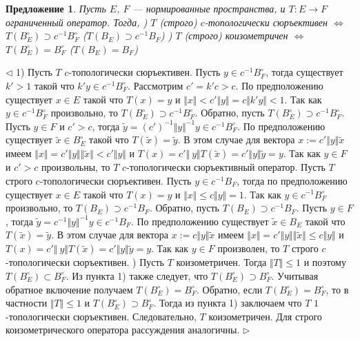 \documentclass[12pt]{article}
\newtheorem{proposition}[theorem]{Предложение}
\newenvironment{proof}{\par $\triangleleft$}{$\triangleright$}
\begin{document}
\begin{proposition}\label{PrEquivDescOfIsomCoisomOp}
Пусть $E$, $F$ --- нормированные пространства,  и $T:E\to F$ ограниченный оператор. Тогда,
) $T$ (строго) $c$-топологически сюръективен $\Longleftrightarrow$ $T(B_E^\circ)\supset c^{-1}B_F^\circ$ ($T(B_E)\supset c^{-1}B_F$) 
) $T$ (строго) коизометричен $\Longleftrightarrow$ $T(B_E^\circ)=B_F^\circ$ ($T(B_E)=B_F$)
\end{proposition}
\begin{proof}
1) Пусть $T$ $c$-топологически сюръективен. Пусть $y\in c^{-1}B_F^\circ$, тогда существует $k'>1$ такой что $k'y\in c^{-1}B_F^\circ$. Рассмотрим $c'=k'c>c$. По предположению существует $x\in E$ такой что $T(x)=y$ и 
$\Vert x\Vert< c'\Vert y\Vert=c\Vert k'y\Vert<1$. Так как $y\in c^{-1}B_F^\circ$ произвольно, то $T(B_E^\circ)\supset c^{-1}B_F^\circ$. Обратно, пусть $T(B_E^\circ)\supset c^{-1}B_F^\circ$. Пусть $y\in F$ и $c'>c$, тогда 
$\tilde{y}=(c')^{-1}\Vert y\Vert^{-1}y\in c^{-1}B_F^\circ$. По предположению существует $\tilde{x}\in B_E^\circ$ такой что $T(\tilde{x})=\tilde{y}$. В этом случае для вектора $x:=c'\Vert y\Vert\tilde{x}$ имеем 
$\Vert x \Vert=c'\Vert y\Vert\Vert\tilde{x}\Vert< c'\Vert y\Vert$ и $T(x)=c'\Vert\ y\Vert T(\tilde{x})=c'\Vert y\Vert\tilde{y}=y$. Так как $y\in F$ и $c'>c$ произвольны, то $T$ $c$-топологически сюръективный оператор.
\newline
Пусть $T$ строго $c$-топологически сюръективен. Пусть $y\in c^{-1}B_F$, тогда по 
предположению существует $x\in E$ такой что $T(x)=y$ и $\Vert x\Vert\leq c\Vert 
y\Vert=1$. Так как $y\in c^{-1}B_F^\circ$ произвольно, то $T(B_E)\supset c^{-1}B_F$. 
Обратно, пусть $T(B_E)\supset c^{-1}B_F$. Пусть $y\in F$, тогда 
$\tilde{y}=c^{-1}\Vert y\Vert^{-1}y\in c^{-1}B_F$. По предположению существует 
$\tilde{x}\in B_E$ такой что $T(\tilde{x})=\tilde{y}$. В этом случае для вектора 
$x:=c\Vert y\Vert\tilde{x}$ имеем $\Vert x \Vert=c'\Vert 
y\Vert\Vert\tilde{x}\Vert\leq c\Vert y\Vert$ и $T(x)=c'\Vert\ y\Vert 
T(\tilde{x})=c'\Vert y\Vert\tilde{y}=y$. Так как $y\in F$ произволен, то $T$ строго 
$c$-топологически сюръективен.
) Пусть $T$ коизометричен. Тогда $\Vert T\Vert\leq 1$ и поэтому $T(B_E^\circ)\subset B_F^\circ$. Из пункта 1) также следует, что $T(B_E^\circ)\supset B_F^\circ$. Учитывая обратное включение получаем 
$T(B_E^\circ)=B_F^\circ$. Обратно, если $T(B_E^\circ)=B_F^\circ$, то в частности $\Vert T\Vert\leq 1$ и $T(B_E^\circ)\supset B_F^\circ$. Тогда из пункта 1) заключаем что $T$ $1$-топологически сюръективен. 
Следовательно, $T$ коизометричен. Для строго коизометрического оператора рассуждения аналогичны.
\end{proof}
\end{document}
